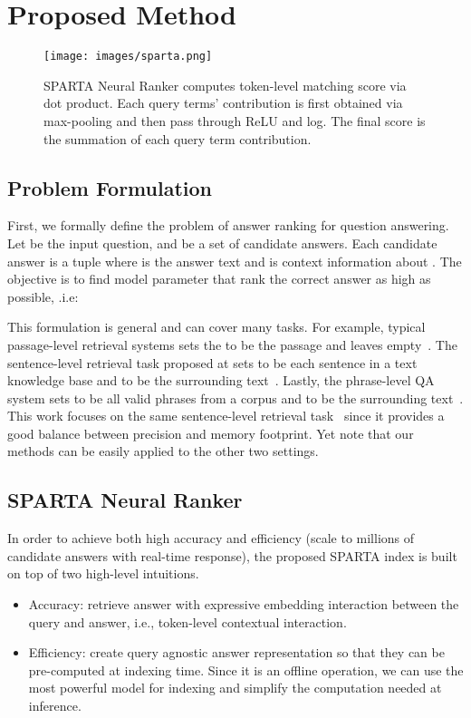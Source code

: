 \documentclass[11pt,a4paper]{article}
\begin{document}
 
\section{Proposed Method}
\begin{figure*}[t]
\centering
\texttt{[image: images/sparta.png]}
\caption{SPARTA Neural Ranker computes token-level matching score via dot product. Each query terms' contribution is first obtained via max-pooling and then pass through ReLU and log. The final score is the summation of each query term contribution.}
\label{fig:overview}
\end{figure*}

\subsection{Problem Formulation}
First, we formally define the problem of answer ranking for question answering. Let  be the input question, and  be a set of candidate answers. Each candidate answer is a tuple  where  is the answer text and  is context information about . The objective is to find model parameter  that rank the correct answer as high as possible, .i.e:


This formulation is general and can cover many tasks. For example, typical passage-level retrieval systems sets the  to be the passage and leaves  empty~\cite{chen2017reading,yang2019end}. The sentence-level retrieval task proposed at sets  to be each sentence in a text knowledge base and  to be the surrounding text~\cite{ahmad2019reqa}. Lastly, the phrase-level QA system sets  to be all valid phrases from a corpus and  to be the surrounding text~\cite{seo2019real}. This work focuses on the same sentence-level retrieval task~\cite{ahmad2019reqa} since it provides a good balance between precision and memory footprint. Yet note that our methods can be easily applied to the other two settings. 


\subsection{SPARTA Neural Ranker}
In order to achieve both high accuracy and efficiency (scale to millions of candidate answers with real-time response), the proposed SPARTA index is built on top of two high-level intuitions.
\begin{itemize}
    \item Accuracy: retrieve answer with expressive embedding interaction between the query and answer, i.e., token-level contextual interaction. 
    \item Efficiency: create query agnostic answer representation so that they can be pre-computed at indexing time. Since it is an offline operation, we can use the most powerful model for indexing and simplify the computation needed at inference.
\end{itemize}
\end{document}
